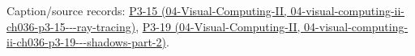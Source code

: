 Caption/source records: \href{../04-Visual-Computing-II/main.pdf\#nameddest=04-visual-computing-ii-ch036-p3-15---ray-tracing}{P3-15 (04-Visual-Computing-II, 04-visual-computing-ii-ch036-p3-15-\/-\/-ray-tracing)}, \href{../04-Visual-Computing-II/main.pdf\#nameddest=04-visual-computing-ii-ch036-p3-19---shadows-part-2}{P3-19 (04-Visual-Computing-II, 04-visual-computing-ii-ch036-p3-19-\/-\/-shadows-part-2)}.
